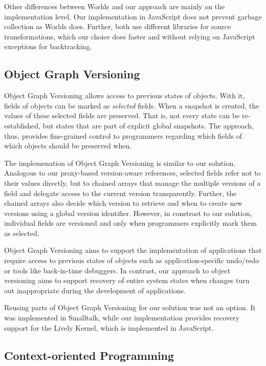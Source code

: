 Other differences between Worlds and our approach are mainly on the implementation level.
Our implementation in JavaScript does not prevent garbage collection as Worlds does.
Further, both use different libraries for source transformations, which our choice does faster and without relying on JavaScript exceptions for backtracking.


\subsection{Object Graph Versioning}

Object Graph Versioning\cite{Pluquet2009ECP} allows access to previous states of objects.
With it, fields of objects can be marked as \emph{selected} fields.
When a snapshot is created, the values of these selected fields are preserved.
That is, not every state can be re-established, but states that are part of explicit global snapshots. 
The approach, thus, provides fine-grained control to programmers regarding which fields of which objects should be preserved when.

The implemenation of Object Graph Versioning is similar to our solution.
Analogous to our proxy-based version-aware references, selected fields refer not to their values directly, but to chained arrays that manage the multiple versions of a field and delegate access to the current version transparently.
Further, the chained arrays also decide which version to retrieve and when to create new versions using a global version identifier.
However, in constrast to our sulution, individual fields are versioned and only when programmers explicitly mark them as selected.

Object Graph Versioning aims to support the implementation of applications that require access to previous states of objects such as application-specific undo/redo or tools like back-in-time debuggers.
In contrast, our approach to object versioning aims to support recovery of entire system states when changes turn out inappropriate during the development of applications.

Reusing parts of Object Graph Versioning for our solution was not an option.
It was implemented in Smalltalk, while our implementation provides recovery support for the Lively Kernel, which is implemented in JavaScript.


\subsection{Context-oriented Programming}

